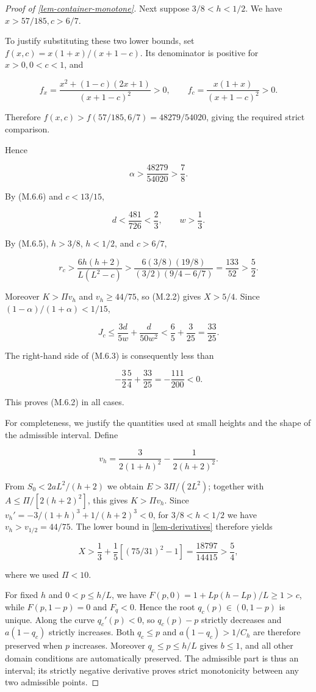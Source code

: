 \documentclass[11pt,a4paper]{article}
\theoremstyle{proofmanuscript}
\begin{document}
\begin{proof}[Proof of \ref{lem-container-monotone}]
Next suppose \(3/8<h<1/2\). We have \(x>57/185,c>6/7\).

To justify substituting these two lower bounds, set \(f(x,c)=x(1+x)/(x+1-c)\). Its denominator is positive for \(x>0,0<c<1\), and

\[
f_x=\frac{x^2+(1-c)(2x+1)}{(x+1-c)^2}>0,\qquad
f_c=\frac{x(1+x)}{(x+1-c)^2}>0.
\]

Therefore \(f(x,c)>f(57/185,6/7)=48279/54020\), giving the required strict comparison.

Hence

\[
\alpha>\frac{48279}{54020}>\frac78.
\]

By (M.6.6) and \(c<13/15\),

\[
d<\frac{481}{726}<\frac23,\qquad w>\frac13.
\]

By (M.6.5), \(h>3/8\), \(h<1/2\), and \(c>6/7\),

\[
r_c>\frac{6h(h+2)}{L(L^2-c)}
>\frac{6(3/8)(19/8)}{(3/2)(9/4-6/7)}
=\frac{133}{52}>\frac52.
\]

Moreover \(K>\Pi v_h\) and \(v_h\ge44/75\), so (M.2.2) gives \(X>5/4\). Since \((1-\alpha)/(1+\alpha)<1/15\),

\[
J_c\le\frac{3d}{5w}+\frac{d}{50w^2}
<\frac65+\frac3{25}=\frac{33}{25}.
\]

The right-hand side of (M.6.3) is consequently less than

\[
-\frac32\frac54+\frac{33}{25}=-\frac{111}{200}<0.
\]

This proves (M.6.2) in all cases.

For completeness, we justify the quantities used at small heights and the shape of the admissible interval. Define

\[
v_h=\frac3{2(1+h)^2}-\frac1{2(h+2)^2}.
\]

From \(S_0<2aL^2/(h+2)\) we obtain \(E>3\Pi/(2L^2)\); together with \(A\le\Pi/[2(h+2)^2]\), this gives \(K>\Pi v_h\). Since \(v_h'=-3/(1+h)^3+1/(h+2)^3<0\), for \(3/8<h<1/2\) we have \(v_h>v_{1/2}=44/75\). The lower bound in \ref{lem-derivatives} therefore yields

\[
X>\frac13+\frac15[(75/31)^2-1]=\frac{18797}{14415}>\frac54,
\]

where we used \(\Pi<10\).

For fixed \(h\) and \(0<p\le h/L\), we have \(F(p,0)=1+Lp(h-Lp)/L\ge1>c\), while \(F(p,1-p)=0\) and \(F_q<0\). Hence the root \(q_c(p)\in(0,1-p)\) is unique. Along the curve \(q_c'(p)<0\), so \(q_c(p)-p\) strictly decreases and \(a(1-q_c)\) strictly increases. Both \(q_c\le p\) and \(a(1-q_c)>1/C_h\) are therefore preserved when \(p\) increases. Moreover \(q_c\le p\le h/L\) gives \(b\le1\), and all other domain conditions are automatically preserved. The admissible part is thus an interval; its strictly negative derivative proves strict monotonicity between any two admissible points.

\end{proof}
\end{document}
